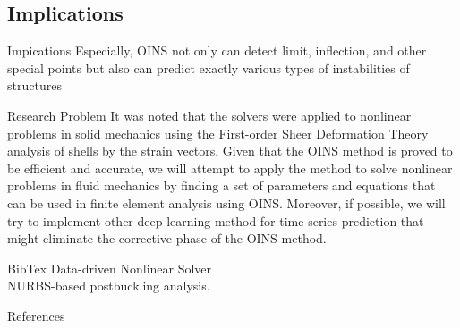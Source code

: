 \documentclass[
10pt,
aspectratio=169,
]{beamer}
\begin{document}
\subsection{Implications}
\begin{frame}{Impications}
    Especially, OINS not only can detect limit, inflection,
and other special points but also can predict exactly various types of instabilities of structures
\end{frame}
\begin{frame}{Research Problem}
    It was noted that the solvers were applied to nonlinear problems in solid mechanics using the First-order Sheer Deformation Theory analysis of shells by the strain vectors. Given that the OINS method is proved to be efficient and accurate, we will attempt to apply the method to solve nonlinear problems in fluid mechanics by finding a set of parameters and equations that can be used in finite element analysis using OINS. Moreover, if possible, we will try to implement other deep learning method for time series prediction that might eliminate the corrective phase of the OINS method. 
\end{frame}
\begin{frame}{BibTex}
    \cite{Nguyen1} Data-driven Nonlinear Solver\\
    \cite{Nguyen2} NURBS-based postbuckling analysis.
\end{frame}
\begin{frame}{References}


\end{frame}
\end{document}
